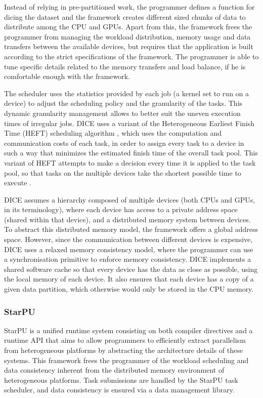 Instead of relying in pre-partitioned work, the programmer defines a function for dicing the dataset and the framework creates different sized chunks of data to distribute among the CPU and GPUs. Apart from this, the framework frees the programmer from managing the workload distribution, memory usage and data transfers between the available devices, but requires that the application is built according to the strict specifications of the framework. The programmer is able to tune specific details related to the memory transfers and load balance, if he is comfortable enough with the framework.

The scheduler uses the statistics provided by each job (a kernel set to run on a device) to adjust the scheduling policy and the granularity of the tasks. This dynamic granularity management allows to better suit the uneven execution times of irregular jobs. DICE uses a variant of the Heterogeneous Earliest Finish Time (HEFT) scheduling algorithm \cite{HEFT}, which uses the computation and communication costs of each task, in order to assign every task to a device in such a way that minimizes the estimated finish time of the overall task pool. This variant of HEFT attempts to make a decision every time it is applied to the task pool, so that tasks on the multiple devices take the shortest possible time to execute \cite{Msc:Mariano}.

DICE assumes a hierarchy composed of multiple devices (both CPUs and GPUs, in its terminology), where each device has access to a private address space (shared within that device), and a distributed memory system between devices. To abstract this distributed memory model, the framework offers a global address space. However, since the communication between different devices is expensive, DICE uses a relaxed memory consistency model, where the programmer can use a synchronisation primitive to enforce memory consistency. DICE implements a shared software cache so that every device has the data as close as possible, using the local memory of each device. It also ensures that each device has a copy of a given data partition, which otherwise would only be stored in the CPU memory.

\subsubsection*{StarPU}

StarPU \cite{STARPU} is a unified runtime system consisting on both compiler directives and a runtime API that aims to allow programmers to efficiently extract parallelism from heterogeneous platforms by abstracting the architecture details of these systems. This framework frees the programmer of the workload scheduling and data consistency inherent from the distributed memory environment of heterogeneous platforms. Task submissions are handled by the StarPU task scheduler, and data consistency is ensured via a data management library.

